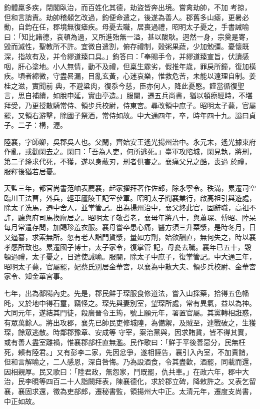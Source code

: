 \begin{pinyinscope}
 鈞體羸多疾，閉閣臥治，而百姓化其德，劫盜皆奔出境。嘗禽劫帥，不加
 考掠，但和言誚責。劫帥稽顙乞改過，鈞便命遣之，後遂為善人。郡舊多山瘧，更暑必動，自鈞在任，郡境無復瘧疾。母憂去職，居喪過禮，昭明太子憂之，手書誡喻曰：「知比諸德，哀頓為過，又所進殆無一溢，甚以酸耿。迥然一身，宗奠是寄，毀而滅性，聖教所不許。宜微自遣割，俯存禮制，穀粥果蔬，少加勉彊。憂懷既深，指故有及，并令繆道臻口具。」鈞答曰：「奉賜手令，并繆道臻宣旨，伏讀感咽，肝心塗地。小人無情，動不及禮，但稟生霡劣，假推年歲，罪戾所鐘，復加橫疾。頃者綿微，守盡晷漏，目亂玄黃，心迷哀樂，惟救危苦，未能以遠理自制。姜桂之滋，實聞前
 典，不避粱肉，復忝今慈，臣亦何人，降此憂愍。謹當循復聖言，思自補續，如脫申延，實由亭造。」服闋，遷五兵尚書，猶以頓瘵經時，不堪拜受，乃更授散騎常侍、領步兵校尉，侍東宮。尋改領中庶子。昭明太子薨，官屬罷，又領右游擊，除國子祭酒，常侍如故。中大通四年，卒，時年四十九。謚曰貞子。二子：構，渥。



 陸襄，字師卿，吳郡吳人也。父閑，齊始安王遙光揚州治中。永元末，遙光據東府作亂，或勸閑去之。閑曰：「吾為人吏，何所逃死。」臺軍攻陷城，閑見執，將刑，第二子絳求代死，不獲，遂以身蔽刃，刑者俱害之。襄痛父兄之酷，喪過
 於禮，服釋後猶若居憂。



 天監三年，都官尚書范岫表薦襄，起家擢拜著作佐郎，除永寧令。秩滿，累遷司空臨川王法曹，外兵，輕車廬陵王記室參軍。昭明太子聞襄業行，啟高祖引與遊處，除太子洗馬，遷中舍人，並掌管記。出為揚州治中，襄父終此官，固辭職，高祖不許，聽與府司馬換廨居之。昭明太子敬耆老，襄母年將八十，與蕭琛、傅昭、陸杲每月常遣存問，加賜珍羞衣服。襄母嘗卒患心痛，醫方須三升粟漿，是時冬月，日又逼暮，求索無所。忽有老人詣門貨漿，量如方劑，始欲酬直，無何失之，時以襄孝感所致也。累遷國子博士，太子家令，復掌管
 記，母憂去職。襄年已五十，毀頓過禮，太子憂之，日遣使誡喻。服闋，除太子中庶子，復掌管記。中大通三年，昭明太子薨，官屬罷，妃蔡氏別居金華宮，以襄為中散大夫、領步兵校尉、金華宮家令、知金華宮事。



 七年，出為鄱陽內史。先是，郡民鮮于琛服食修道法，嘗入山採藥，拾得五色幡眊，又於地中得石璽，竊怪之。琛先與妻別室，望琛所處，常有異氣，益以為神。大同元年，遂結其門徒，殺廣晉令王筠，號上願元年，署置官屬。其黨轉相誑惑，有眾萬餘人。將出攻郡，襄先已帥民吏修城隍，為備禦，及賊至，連戰破之，生獲琛，餘眾逃散。時鄰郡豫章、安成等
 守宰，案治黨與，因求賄貨，皆不得其實，或有善人盡室離禍，惟襄郡部枉直無濫。民作歌曰：「鮮于平後善惡分，民無枉死，賴有陸君。」又有彭李二家，先因忿爭，遂相誣告，襄引入內室，不加責誚，但和言解喻之，二人感恩，深自咎悔。乃為設酒食，令其盡歡，酒罷，同載而還，因相親厚。民又歌曰：「陸君政，無怨家，鬥既罷，仇共車。」在政六年，郡中大治，民李睍等四百二十人詣闕拜表，陳襄德化，求於郡立碑，降敕許之。又表乞留襄，襄固求還，徵為吏部郎，遷秘書監，領揚州大中正。太清元年，遷度支尚書，中正如故。




\end{pinyinscope}
